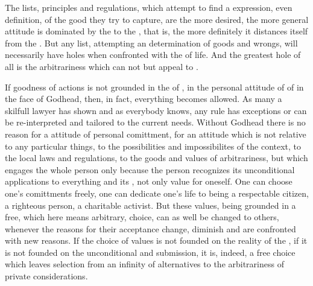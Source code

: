 {{%
The lists, principles and regulations, which attempt to find a 
 expression, even definition, of the good they try to 
capture, are the more desired, the more general attitude is dominated 
by the  to the , that is, the more 
definitely it distances itself from the . But 
any list, attempting an  determination of goods and 
wrongs, will necessarily have holes when confronted with the 
 of life. 
And the greatest hole of all is the arbitrariness which can not but
appeal to .  

If goodness of actions is not grounded in the  of
, in the personal attitude of  of
 in the face of Godhead, then, in fact, everything
becomes allowed.  As many a skilfull lawyer has shown and as everybody 
knows, any rule has
exceptions or can be re-interpreted and tailored to the current needs. 
Without Godhead there is 
no reason for a  attitude of  personal
comittment, for an attitude which is not relative to any particular
things, to the possibilities and impossibilites of the context, to the
local laws and regulations, to the goods and values of
 arbitrariness, but which engages the whole person
only because the person recognizes its unconditional applications to
everything and its , not only  value for 
oneself.  One can choose one's comittments freely, one can dedicate
one's life to being a respectable citizen, a righteous person, a
charitable activist.  But these values, being grounded in a free,
which here means arbitrary, choice, can as well be changed to others,
whenever the reasons for their acceptance change, diminish and are
confronted with new reasons.  If the choice of values is not founded
on the  reality of the , if it is not founded
on the unconditional  and submission, it is, indeed, a free
choice which leaves selection from an infinity of alternatives to the
arbitrariness of  private considerations.  

}}
